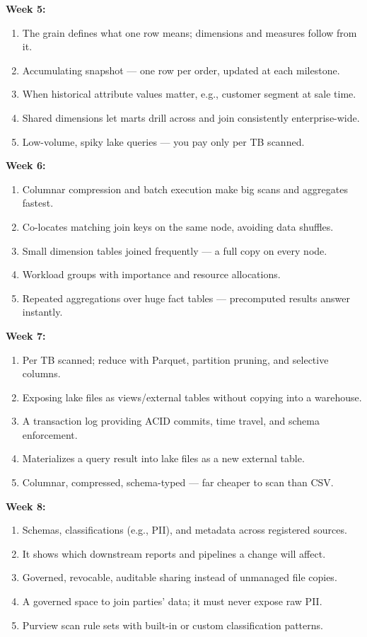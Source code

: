 \documentclass[11pt, a4paper]{article}
\begin{document}
\noindent\textbf{Week 5:}
\begin{enumerate}[itemsep=0pt]
    \item The grain defines what one row means; dimensions and measures follow from it.
    \item Accumulating snapshot --- one row per order, updated at each milestone.
    \item When historical attribute values matter, e.g., customer segment at sale time.
    \item Shared dimensions let marts drill across and join consistently enterprise-wide.
    \item Low-volume, spiky lake queries --- you pay only per TB scanned.
\end{enumerate}
\noindent\textbf{Week 6:}
\begin{enumerate}[itemsep=0pt]
    \item Columnar compression and batch execution make big scans and aggregates fastest.
    \item Co-locates matching join keys on the same node, avoiding data shuffles.
    \item Small dimension tables joined frequently --- a full copy on every node.
    \item Workload groups with importance and resource allocations.
    \item Repeated aggregations over huge fact tables --- precomputed results answer instantly.
\end{enumerate}
\noindent\textbf{Week 7:}
\begin{enumerate}[itemsep=0pt]
    \item Per TB scanned; reduce with Parquet, partition pruning, and selective columns.
    \item Exposing lake files as views/external tables without copying into a warehouse.
    \item A transaction log providing ACID commits, time travel, and schema enforcement.
    \item Materializes a query result into lake files as a new external table.
    \item Columnar, compressed, schema-typed --- far cheaper to scan than CSV.
\end{enumerate}
\noindent\textbf{Week 8:}
\begin{enumerate}[itemsep=0pt]
    \item Schemas, classifications (e.g., PII), and metadata across registered sources.
    \item It shows which downstream reports and pipelines a change will affect.
    \item Governed, revocable, auditable sharing instead of unmanaged file copies.
    \item A governed space to join parties' data; it must never expose raw PII.
    \item Purview scan rule sets with built-in or custom classification patterns.
\end{enumerate}
\end{document}
